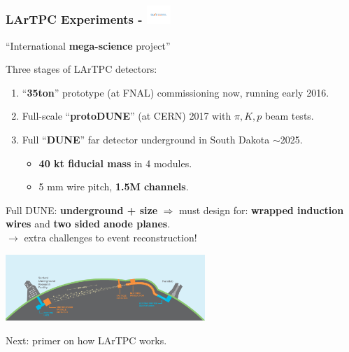 \documentclass[xcolor=dvipsnames]{beamer}
\begin{document}
\begin{frame}[fragile]
  \frametitle{LArTPC Experiments - \includegraphics[height=7mm,trim=4cm 9.2cm 4cm 9.3cm,clip,valign=c]{DUNElogo_colorHORIZONTAL.pdf}}
  \begin{center}
    ``International \textbf{mega-science} project''
  \end{center}

  Three stages of LArTPC detectors:
  \begin{enumerate}\footnotesize
  \item ``\textbf{35ton}'' prototype (at FNAL) commissioning now, running early 2016.
  \item Full-scale ``\textbf{protoDUNE}'' (at CERN) 2017 with $\pi, K, p$ beam tests.
  \item Full ``\textbf{DUNE}'' far detector underground in South Dakota $\sim$2025.
    \begin{itemize}
    \item \textbf{40 kt fiducial mass} in 4 modules.
    \item 5 mm wire pitch, \textbf{1.5M channels}.
    \end{itemize}
  \end{enumerate}
  Full DUNE: \textbf{underground + size} $\Rightarrow$ must design for: \textbf{wrapped
    induction wires} and \textbf{two sided anode planes}.\\
  $\rightarrow$ extra challenges to event reconstruction!

  \begin{center}
    \includegraphics[height=25mm]{LBNF_Graphic_021715-1024x340.png}
  \end{center}

\end{frame}

\begin{frame}
  \begin{center}
    Next: primer on how LArTPC works.
  \end{center}
\end{frame}
\end{document}

